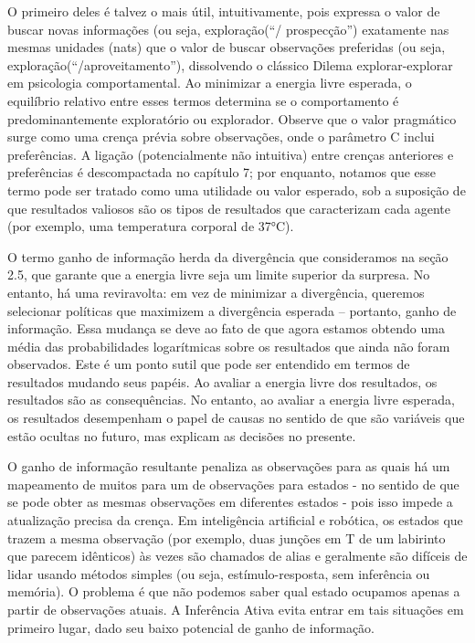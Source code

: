 \documentclass[
  12pt,
]{book}
\begin{document}
O primeiro deles é talvez o mais útil, intuitivamente, pois expressa o valor de buscar novas informações (ou seja, exploração(``/ prospecção'') exatamente nas mesmas unidades (nats) que o valor de buscar observações preferidas (ou seja, exploração(``/aproveitamento''), dissolvendo o clássico Dilema explorar-explorar em psicologia comportamental. Ao minimizar a energia livre esperada, o equilíbrio relativo entre esses termos determina se o comportamento é predominantemente exploratório ou explorador. Observe que o valor pragmático surge como uma crença prévia sobre observações, onde o parâmetro C inclui preferências.
A ligação (potencialmente não intuitiva) entre crenças anteriores e preferências é descompactada no capítulo 7; por enquanto, notamos que esse termo pode ser tratado como uma utilidade ou valor esperado, sob a suposição de que resultados valiosos são os tipos de resultados que caracterizam cada agente (por exemplo, uma temperatura corporal de 37°C).

O termo ganho de informação herda da divergência que consideramos na seção 2.5, que garante que a energia livre seja um limite superior da surpresa. No entanto, há uma reviravolta: em vez de minimizar a divergência, queremos selecionar políticas que maximizem a divergência esperada -- portanto, ganho de informação. Essa mudança se deve ao fato de que agora estamos obtendo uma média das probabilidades logarítmicas sobre os resultados que ainda não foram observados. Este é um ponto sutil que pode ser entendido em termos de resultados mudando seus papéis. Ao avaliar a energia livre dos resultados, os resultados são as consequências. No entanto, ao avaliar a energia livre esperada, os resultados desempenham o papel de causas no sentido de que são variáveis que estão ocultas no futuro, mas explicam as decisões no presente.

O ganho de informação resultante penaliza as observações para as quais há um mapeamento de muitos para um de observações para estados - no sentido de que se pode obter as mesmas observações em diferentes estados - pois isso impede a atualização precisa da crença. Em inteligência artificial e robótica, os estados que trazem a mesma observação (por exemplo, duas junções em T de um labirinto que parecem idênticos) às vezes são chamados de alias e geralmente são difíceis de lidar usando métodos simples (ou seja, estímulo-resposta, sem inferência ou memória).
O problema é que não podemos saber qual estado ocupamos apenas a partir de observações atuais. A Inferência Ativa evita entrar em tais situações em primeiro lugar, dado seu baixo potencial de ganho de informação.
\end{document}
